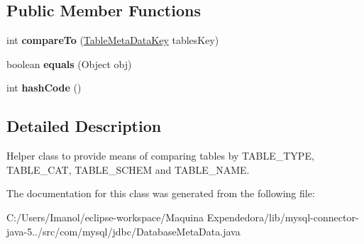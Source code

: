 \subsection*{Public Member Functions}
\begin{DoxyCompactItemize}
\item 
\mbox{\label{classcom_1_1mysql_1_1jdbc_1_1_database_meta_data_1_1_table_meta_data_key_a0034c997e0a831f2b0c5f403b45abffa}} 
int {\bfseries compare\+To} (\mbox{\hyperlink{classcom_1_1mysql_1_1jdbc_1_1_database_meta_data_1_1_table_meta_data_key}{Table\+Meta\+Data\+Key}} tables\+Key)
\item 
\mbox{\label{classcom_1_1mysql_1_1jdbc_1_1_database_meta_data_1_1_table_meta_data_key_a3613e286bf0e5e426928292e01763c7a}} 
boolean {\bfseries equals} (Object obj)
\item 
\mbox{\label{classcom_1_1mysql_1_1jdbc_1_1_database_meta_data_1_1_table_meta_data_key_aceea244a6927994b59c5066bdc3ba120}} 
int {\bfseries hash\+Code} ()
\end{DoxyCompactItemize}


\subsection{Detailed Description}
Helper class to provide means of comparing tables by T\+A\+B\+L\+E\+\_\+\+T\+Y\+PE, T\+A\+B\+L\+E\+\_\+\+C\+AT, T\+A\+B\+L\+E\+\_\+\+S\+C\+H\+EM and T\+A\+B\+L\+E\+\_\+\+N\+A\+ME. 

The documentation for this class was generated from the following file\+:\begin{DoxyCompactItemize}
\item 
C\+:/\+Users/\+Imanol/eclipse-\/workspace/\+Maquina Expendedora/lib/mysql-\/connector-\/java-\/5../src/com/mysql/jdbc/Database\+Meta\+Data.\+java\end{DoxyCompactItemize}
